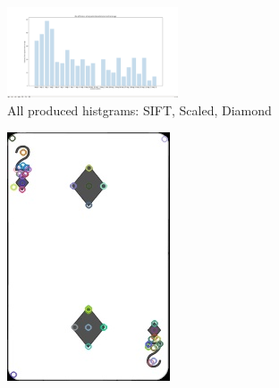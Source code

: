 \documentclass[conference]{IEEEtran}
\begin{document}
\begin{figure}[!htp]
\includegraphics[width=0.45\textwidth]{../programme/results/Task_1/scaled_experiements/SIFT/diamond/keypoints_found.png}
\centering
\caption{All produced histgrams: SIFT, Scaled, Diamond}
\label{All produced histgrams: SIFT, scaled, Diamond}
\end{figure}

\begin{figure}[!htb]
  \centering
  \begin{minipage}[b]{0.2\textwidth}
    \includegraphics[width=\textwidth]{../programme/results/Task_1/scaled_experiements/SIFT/diamond/image_0.jpg}

\end{minipage}
\end{figure}
\end{document}
